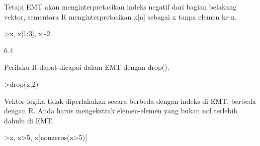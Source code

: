 \documentclass[a4paper,10pt]{article}
\begin{document}
\begin{eulernotebook}
\begin{eulercomment}
\begin{eulercomment}
\begin{eulercomment}
\begin{eulercomment}
\begin{eulercomment}
\begin{eulercomment}
\begin{eulercomment}
\begin{eulercomment}
\begin{eulercomment}
\begin{eulercomment}
\begin{eulercomment}
\begin{eulercomment}
\begin{eulercomment}
\begin{eulercomment}
\begin{eulercomment}
\begin{eulercomment}
\begin{eulercomment}
\begin{eulercomment}
\begin{eulercomment}
\begin{eulercomment}
\begin{eulercomment}
\begin{eulercomment}
\begin{eulercomment}
\begin{eulercomment}
\begin{eulercomment}
\begin{eulercomment}
\begin{eulercomment}
\begin{eulercomment}
\begin{eulercomment}
\begin{eulercomment}
\begin{eulercomment}
\begin{eulercomment}
\begin{eulercomment}
\begin{eulercomment}
\begin{eulercomment}
\begin{eulercomment}
\begin{eulercomment}
\begin{eulercomment}
\begin{eulercomment}
\begin{eulercomment}
\begin{eulercomment}
\begin{eulercomment}
\begin{eulercomment}
\begin{eulercomment}
\begin{eulercomment}
\begin{eulercomment}
\begin{eulercomment}
\begin{eulercomment}
\begin{eulercomment}
Tetapi EMT akan menginterpretasikan indeks negatif dari bagian
belakang vektor, sementara R menginterpretasikan x[n] sebagai x tanpa
elemen ke-n.
\end{eulercomment}
\begin{eulerprompt}
>x, x[1:3], x[-2]
\end{eulerprompt}
\begin{euleroutput}
  [10.4,  5.6,  3.1,  6.4,  21.7]
  [10.4,  5.6,  3.1]
  6.4
\end{euleroutput}
\begin{eulercomment}
Perilaku R dapat dicapai dalam EMT dengan drop().
\end{eulercomment}
\begin{eulerprompt}
>drop(x,2)
\end{eulerprompt}
\begin{euleroutput}
  [10.4,  3.1,  6.4,  21.7]
\end{euleroutput}
\begin{eulercomment}
Vektor logika tidak diperlakukan secara berbeda dengan indeks di EMT,
berbeda dengan R. Anda harus mengekstrak elemen-elemen yang bukan nol
terlebih dahulu di EMT.
\end{eulercomment}
\begin{eulerprompt}
>x, x>5, x[nonzeros(x>5)]
\end{eulerprompt}

\end{eulercomment}
\end{eulercomment}
\end{eulercomment}
\end{eulercomment}
\end{eulercomment}
\end{eulercomment}
\end{eulercomment}
\end{eulercomment}
\end{eulercomment}
\end{eulercomment}
\end{eulercomment}
\end{eulercomment}
\end{eulercomment}
\end{eulercomment}
\end{eulercomment}
\end{eulercomment}
\end{eulercomment}
\end{eulercomment}
\end{eulercomment}
\end{eulercomment}
\end{eulercomment}
\end{eulercomment}
\end{eulercomment}
\end{eulercomment}
\end{eulercomment}
\end{eulercomment}
\end{eulercomment}
\end{eulercomment}
\end{eulercomment}
\end{eulercomment}
\end{eulercomment}
\end{eulercomment}
\end{eulercomment}
\end{eulercomment}
\end{eulercomment}
\end{eulercomment}
\end{eulercomment}
\end{eulercomment}
\end{eulercomment}
\end{eulercomment}
\end{eulercomment}
\end{eulercomment}
\end{eulercomment}
\end{eulercomment}
\end{eulercomment}
\end{eulercomment}
\end{eulercomment}
\end{eulercomment}
\end{eulernotebook}
\end{document}
